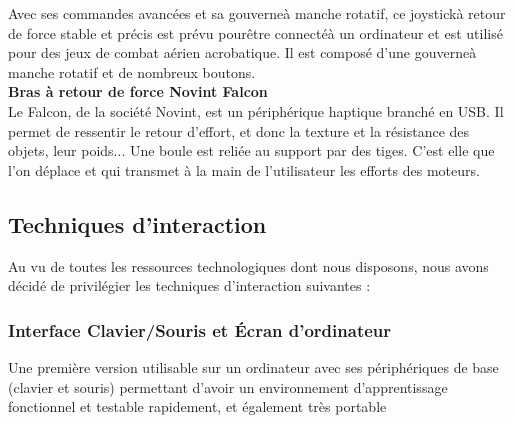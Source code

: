 Avec ses commandes avanc\'ees et sa gouverne\`a manche rotatif, ce joystick\`a retour de force stable et pr\'ecis est pr\'evu pour\^etre connect\'e\`a un ordinateur et est utilis\'e pour des jeux de combat a\'erien acrobatique. Il est compos\'e d'une gouverne\`a manche rotatif et de nombreux boutons.
\\

\textbf{Bras \`a retour de force Novint Falcon}
\\

Le Falcon, de la soci\'et\'e Novint, est un p\'eriph\'erique haptique branch\'e en USB. Il permet de ressentir le retour d'effort, et donc la texture et la r\'esistance des objets, leur poids... Une boule est reli\'ee au support par des tiges. C'est elle que l'on d\'eplace et qui transmet \`a la main de l'utilisateur les efforts des moteurs.
\\

\subsection{Techniques d'interaction}
Au vu de toutes les ressources technologiques dont nous disposons, nous avons d\'ecid\'e de privilégier les techniques d'interaction suivantes :

\subsubsection{Interface Clavier/Souris et \'Ecran d'ordinateur}
Une premi\`ere version utilisable sur un ordinateur avec ses p\'eriph\'eriques de base (clavier et souris) permettant d'avoir un environnement d'apprentissage fonctionnel et testable rapidement, et \'egalement tr\`es portable
\\

